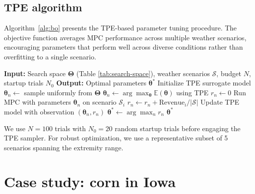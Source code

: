 \documentclass[preprint,12pt]{elsarticle}
\begin{document}
\subsection{TPE algorithm}\label{subsec:bo-algorithm}

Algorithm~\ref{alg:bo} presents the TPE-based parameter tuning procedure. The objective function averages MPC performance across multiple weather scenarios, encouraging parameters that perform well across diverse conditions rather than overfitting to a single scenario.

\begin{algorithm}[ht]
\caption{Bayesian Optimization for MPC Parameter Tuning}
\label{alg:bo}
\begin{algorithmic}[1]
\State \textbf{Input:} Search space $\boldsymbol{\Theta}$ (Table \ref{tab:search-space}), weather scenarios $\mathcal{S}$, budget $N$, startup trials $N_0$
\State \textbf{Output:} Optimal parameters $\boldsymbol{\theta}^*$
\State
\State Initialize TPE surrogate model
        \State $\boldsymbol{\theta}_n \leftarrow$ sample uniformly from $\boldsymbol{\Theta}$
    \Else
        \State $\boldsymbol{\theta}_n \leftarrow \arg\max_{\boldsymbol{\theta}} \mathbb{E}(\boldsymbol{\theta})$ using TPE
    \EndIf
    \State
    \State $r_n \leftarrow 0$
        \State Run MPC with parameters $\boldsymbol{\theta}_n$ on scenario $\mathcal{S}_i$
        \State $r_n \leftarrow r_n + \text{Revenue}_i / |\mathcal{S}|$
    \EndFor
    \State Update TPE model with observation $(\boldsymbol{\theta}_n, r_n)$
\EndFor
\State
\State $\boldsymbol{\theta}^* \leftarrow \arg\max_n r_n$
\State \Return $\boldsymbol{\theta}^*$
\end{algorithmic}
\end{algorithm}

We use $N = 100$ trials with $N_0 = 20$ random startup trials before engaging the TPE sampler. For robust optimization, we use a representative subset of 5 scenarios spanning the extremity range.


\pagebreak
\section{Case study: corn in Iowa}\label{sec:case-study}
\end{document}
